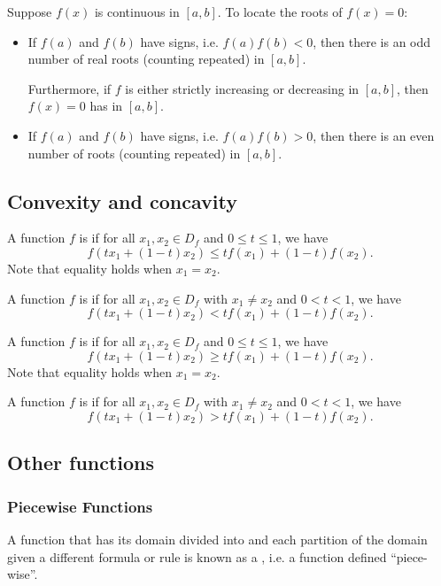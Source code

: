 Suppose $f(x)$ is continuous in $[a,b]$. To locate the roots of $f(x)=0$:
\begin{itemize}
\item If $f(a)$ and $f(b)$ have  signs, i.e. $f(a)f(b)<0$, then there is an odd number of real roots (counting repeated) in $[a,b]$.

Furthermore, if $f$ is either strictly increasing or decreasing in $[a,b]$, then $f(x)=0$ has  in $[a,b]$.

\item If $f(a)$ and $f(b)$ have  signs, i.e. $f(a)f(b)>0$, then there is an even number of roots (counting repeated) in $[a,b]$.
\end{itemize}

\subsection{Convexity and concavity}
\begin{definition}
A function $f$ is  if for all $x_1,x_2\in D_f$ and $0\le t\le 1$, we have
\[ f(tx_1+(1-t)x_2)\le tf(x_1)+(1-t)f(x_2). \]
Note that equality holds when $x_1=x_2$.
\end{definition}

\begin{definition}
A function $f$ is  if for all $x_1,x_2\in D_f$ with $x_1\neq x_2$ and $0<t<1$, we have
\[ f(tx_1+(1-t)x_2)<tf(x_1)+(1-t)f(x_2). \]
\end{definition}

\begin{definition}
A function $f$ is  if for all $x_1,x_2\in D_f$ and $0\le t\le 1$, we have
\[ f(tx_1+(1-t)x_2)\ge tf(x_1)+(1-t)f(x_2). \]
Note that equality holds when $x_1=x_2$.
\end{definition}

\begin{definition}
A function $f$ is  if for all $x_1,x_2\in D_f$ with $x_1\neq x_2$ and $0<t<1$, we have
\[ f(tx_1+(1-t)x_2)>tf(x_1)+(1-t)f(x_2). \]
\end{definition}

\subsection{Other functions}
\subsubsection{Piecewise Functions}
A function that has its domain divided into  and each partition of the domain given a different formula or rule is known as a , i.e. a function defined ``piece-wise''.

